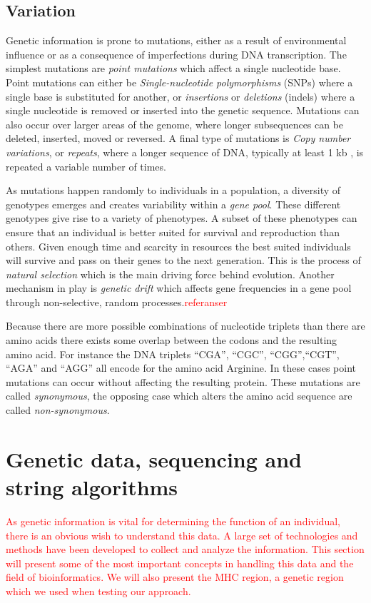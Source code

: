 \documentclass[thesis.tex]{subfiles}
\begin{document}
\subsection{Variation}
\label{sec:genetic_variation}
Genetic information is prone to mutations, either as a result of environmental influence or as a consequence of imperfections during DNA transcription. The simplest mutations are \textit{point mutations} which affect a single nucleotide base. Point mutations can either be \textit{Single-nucleotide polymorphisms} (SNPs) where a single base is substituted for another, or \textit{insertions} or \textit{deletions} (indels) where a single nucleotide is removed or inserted into the genetic sequence. Mutations can also occur over larger areas of the genome, where longer subsequences can be deleted, inserted, moved or reversed. A final type of mutations is \textit{Copy number variations}, or \textit{repeats}, where a longer sequence of DNA, typically at least 1 kb \cite{copy_number_variation_new_insights_in_genome_diversity}, is repeated a variable number of times.\\
\par\noindent
As mutations happen randomly to individuals in a population, a diversity of genotypes emerges and creates variability within a \textit{gene pool}. These different genotypes give rise to a variety of phenotypes. A subset of these phenotypes can ensure that an individual is better suited for survival and reproduction than others. Given enough time and scarcity in resources the best suited individuals will survive and pass on their genes to the next generation. This is the process of \textit{natural selection} which is the main driving force behind evolution. Another mechanism in play is \textit{genetic drift} which affects gene frequencies in a gene pool through non-selective, random processes.\textcolor{red}{referanser} \\
\par\noindent
Because there are more possible combinations of nucleotide triplets than there are amino acids there exists some overlap between the codons and the resulting amino acid. For instance the DNA triplets ``CGA'', ``CGC'', ``CGG'',``CGT'', ``AGA'' and ``AGG''  all encode for the amino acid Arginine. In these cases point mutations can occur without affecting the resulting protein. These mutations are called \textit{synonymous}, the opposing case which alters the amino acid sequence are called \textit{non-synonymous}.
\section{Genetic data, sequencing and string algorithms}
\textcolor{red}{As genetic information is vital for determining the function of an individual, there is an obvious wish to understand this data. A large set of technologies and methods have been developed to collect and analyze the information. This section will present some of the most important concepts in handling this data and the field of bioinformatics. We will also present the MHC region, a genetic region which we used when testing our approach.}
\end{document}
